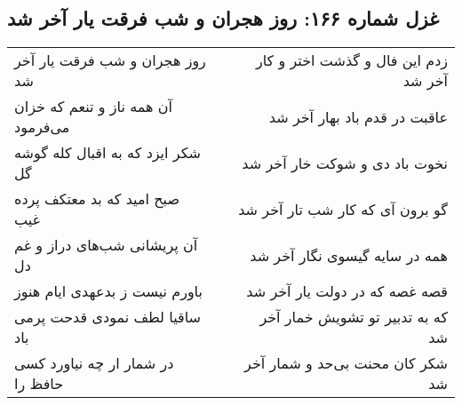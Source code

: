 \begin{center}
\section*{غزل شماره ۱۶۶: روز هجران و شب فرقت یار آخر شد}
\label{sec:sh166}
\begin{longtable}{l p{0.5cm} r}
روز هجران و شب فرقت یار آخر شد
&&
زدم این فال و گذشت اختر و کار آخر شد
\\
آن همه ناز و تنعم که خزان می‌فرمود
&&
عاقبت در قدم باد بهار آخر شد
\\
شکر ایزد که به اقبال کله گوشه گل
&&
نخوت باد دی و شوکت خار آخر شد
\\
صبح امید که بد معتکف پرده غیب
&&
گو برون آی که کار شب تار آخر شد
\\
آن پریشانی شب‌های دراز و غم دل
&&
همه در سایه گیسوی نگار آخر شد
\\
باورم نیست ز بدعهدی ایام هنوز
&&
قصه غصه که در دولت یار آخر شد
\\
ساقیا لطف نمودی قدحت پرمی باد
&&
که به تدبیر تو تشویش خمار آخر شد
\\
در شمار ار چه نیاورد کسی حافظ را
&&
شکر کان محنت بی‌حد و شمار آخر شد
\\
\end{longtable}
\end{center}
